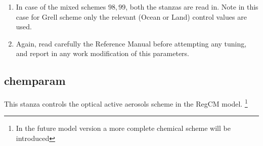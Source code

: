 \begin{enumerate}
\item In case of the mixed schemes $98, 99$, both the stanzas are read in. Note
in this case for Grell scheme only the relevant (Ocean or Land) control values
are used.
\item Again, read carefully the Reference Manual before attempting any tuning,
and report in any work modification of this parameters.
\end{enumerate}

\subsection{chemparam}

This stanza controls the optical active aerosols scheme in the RegCM model.
\footnote{In the future model version a more complete chemical scheme will
be introduced} 

